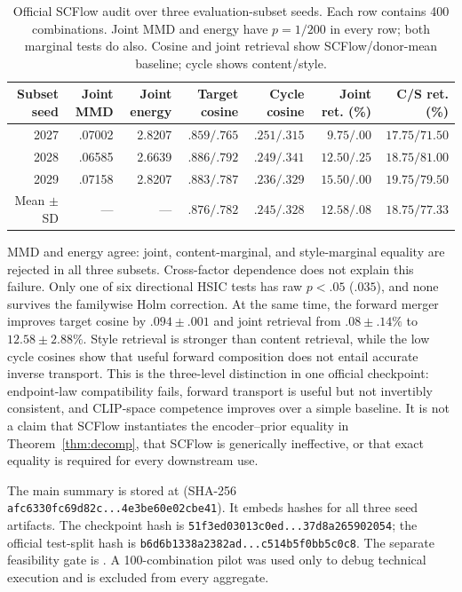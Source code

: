 \begin{table}[ht]
\caption{Official SCFlow audit over three evaluation-subset seeds.  Each row
contains 400 combinations.  Joint MMD and energy have $p=1/200$ in every row;
both marginal tests do also.  Cosine and joint retrieval show
SCFlow/donor-mean baseline; cycle shows content/style.}
\label{tab:scflow-official}
\centering
\scriptsize
\setlength{\tabcolsep}{4pt}
\begin{tabular}{rrrrrrr}
\toprule
Subset seed & Joint MMD & Joint energy & Target cosine & Cycle cosine & Joint ret. (\%) & C/S ret. (\%) \\
\midrule
2027 & .07002 & 2.8207 & $.859/.765$ & $.251/.315$ & $9.75/.00$ & $17.75/71.50$ \\
2028 & .06585 & 2.6639 & $.886/.792$ & $.249/.341$ & $12.50/.25$ & $18.75/81.00$ \\
2029 & .07158 & 2.8207 & $.883/.787$ & $.236/.329$ & $15.50/.00$ & $19.75/79.50$ \\
\midrule
Mean $\pm$ SD & --- & --- & $.876/.782$ & $.245/.328$ & $12.58/.08$ & $18.75/77.33$ \\
\bottomrule
\end{tabular}
\end{table}

MMD and energy agree: joint, content-marginal, and style-marginal equality are
rejected in all three subsets.  Cross-factor dependence does not explain this
failure.  Only one of six directional HSIC tests has raw $p<.05$ ($.035$), and
none survives the familywise Holm correction.  At the same time, the forward
merger improves target cosine by $.094\!\pm\!.001$ and joint retrieval from
$.08\!\pm\!.14\%$ to $12.58\!\pm\!2.88\%$.  Style retrieval is stronger than
content retrieval, while the low cycle cosines show that useful forward
composition does not entail accurate inverse transport.  This is the
three-level distinction in one official checkpoint: endpoint-law compatibility
fails, forward transport is useful but not invertibly consistent, and
CLIP-space competence improves over a simple baseline.  It is not a claim that
SCFlow instantiates the encoder--prior equality in Theorem~\ref{thm:decomp},
that SCFlow is generically ineffective, or that exact equality is required for
every downstream use.

The main summary is stored at
 (SHA-256
\texttt{afc6330fc69d82c...4e3be60e02cbe41}).  It embeds hashes for all three
seed artifacts.  The checkpoint hash is
\texttt{51f3ed03013c0ed...37d8a265902054}; the official test-split hash is
\texttt{b6d6b1338a2382ad...c514b5f0bb5c0c8}.  The separate feasibility gate is
.  A 100-combination pilot was
used only to debug technical execution and is excluded from every aggregate.

